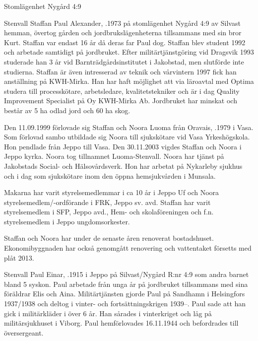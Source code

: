 
Stomlägenhet Nygård 4:9


Stenvall Staffan Paul Alexander, .1973 på stomlägenhet Nygård 4:9 av Silvast hemman, övertog gården och jordbrukslägenheterna tillsammans med sin bror Kurt. Staffan var endast 16 år då deras far Paul dog. Staffan blev student 1992 och arbetade samtidigt på jordbruket. Efter militärtjänstgöring vid Dragsvik 1993 studerade han 3 år vid Barnträdgårdsinstitutet i Jakobstad, men slutförde inte studierna. Staffan är även intresserad av teknik och vårvintern 1997 fick han anställning på KWH-Mirka. Han har haft möjlighet att via läroavtal med Optima studera till processkötare, arbetsledare, kvalitetstekniker och är i dag Quality Improvement Specialist på Oy KWH-Mirka Ab. Jordbruket har minskat och består av 5 ha odlad jord och 60 ha skog.

Den 11.09.1999 förlovade sig Staffan och Noora Luoma från Oravais,	.1979 i Vasa. Som förlovad sambo utbildade sig Noora till sjukskötare vid Vasa Yrkeshögskola. Hon pendlade från Jeppo till Vasa. Den 30.11.2003 vigdes Staffan och Noora i Jeppo kyrka. Noora tog tillnamnet Luoma-Stenvall. Noora har tjänst på Jakobstads Social- och Hälsovårdsverk. Hon har arbetat på Nykarleby sjukhus och i dag som sjukskötare inom den öppna hemsjukvården i Munsala.
\begin{jhchildren}
  \item {}
  \item {}
  \item {}
\end{jhchildren}
Makarna har varit styrelsemedlemmar i ca 10 år i Jeppo Uf och Noora styrelsemedlem/-ordförande i FRK, Jeppo sv. avd. Staffan har varit styrelsemedlem i SFP, Jeppo avd., Hem- och skolaföreningen och f.n. styrelsemedlem i Jeppo ungdomsorkester.

Staffan och Noora har under de senaste åren renoverat bostadshuset. Ekonomibyggnaden har också genomgått renovering och vattentaket försetts med plåt 2013.


Stenvall Paul Einar, .1915 i Jeppo på Silvast/Nygård R:nr 4:9 som andra barnet bland 5 syskon. Paul arbetade från unga år på jordbruket tillsammans med sina föräldrar Elis och Aina. Militärtjänsten gjorde Paul på Sandhamn i Helsingfors 1937/1938 och deltog i vinter- och fortsättningskrigen 1939--. Paul sade att han gick i militärkläder i över 6 år. Han sårades i vinterkriget och låg på militärsjukhuset i Viborg. Paul hemförlovades 16.11.1944 och befordrades till översergeant.

